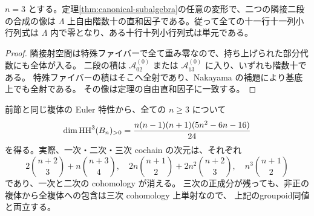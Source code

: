 \begin{corollary}[非被約基底上の合成階数]
\label{cor:artin-rank}
$n=3$ とする。定理\ref{thm:canonical-subalgebra}の任意の変形で、二つの隣接二段の合成の像は
$\Lambda$ 上自由階数十の直和因子である。従って全ての十一行十一列小行列式は
$\Lambda$ 内で零となり、ある十行十列小行列式は単元である。
\end{corollary}
\begin{proof}
隣接射空間は特殊ファイバーで全て重み零なので、持ち上げられた部分代数にも全体が入る。
二段の積は $\mathcal A^{(0)}_{02}$ または $\mathcal A^{(0)}_{13}$ に入り、いずれも階数十である。
特殊ファイバーの積はそこへ全射であり、Nakayama の補題により基底上でも全射である。
その像は定理の自由直和因子に一致する。
\end{proof}

\begin{remark}
前節と同じ複体の Euler 特性から、全ての $n\ge3$ について
\[
 \dim\operatorname{HH}^3(B_n)_{>0}
 =\frac{n(n-1)(n+1)(5n^2-6n-16)}{24}
\]
を得る。実際、一次・二次・三次 cochain の次元は、それぞれ
\[
 2\binom{n+2}{3}+n\binom{n+3}{4},\quad
 2n\binom{n+1}{2}+2n^2\binom{n+2}{3},\quad
 n^3\binom{n+1}{2}
\]
であり、一次と二次の cohomology が消える。
三次の正成分が残っても、非正の複体から全複体への包含は三次 cohomology 上単射なので、
上記のgroupoid同値と両立する。
\end{remark}
